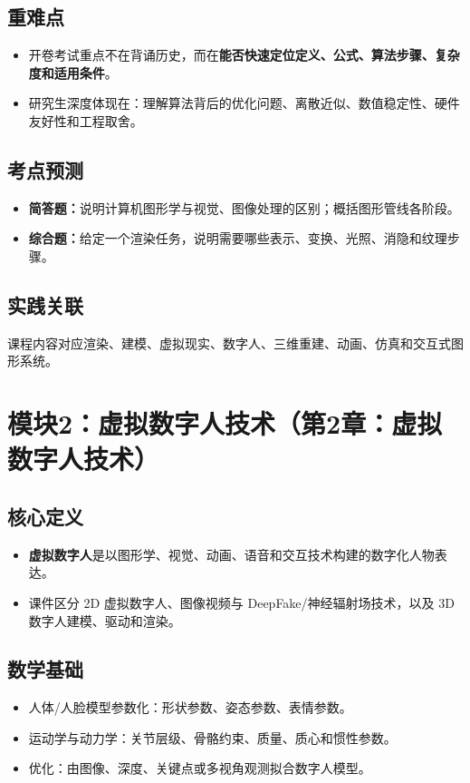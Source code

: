 \documentclass[UTF8,fontset=fandol,11pt]{ctexart}
\newcommand{\key}[1]{\textbf{#1}}
\newcommand{\exam}[1]{\textcolor{blue!55!black}{\textbf{#1}}}
\begin{document}
\subsection{重难点}
\begin{itemize}
  \item 开卷考试重点不在背诵历史，而在\key{能否快速定位定义、公式、算法步骤、复杂度和适用条件}。
  \item 研究生深度体现在：理解算法背后的优化问题、离散近似、数值稳定性、硬件友好性和工程取舍。
\end{itemize}
\subsection{考点预测}
\begin{itemize}
  \item \exam{简答题：}说明计算机图形学与视觉、图像处理的区别；概括图形管线各阶段。
  \item \exam{综合题：}给定一个渲染任务，说明需要哪些表示、变换、光照、消隐和纹理步骤。
\end{itemize}
\subsection{实践关联}
课程内容对应渲染、建模、虚拟现实、数字人、三维重建、动画、仿真和交互式图形系统。

\section{模块2：虚拟数字人技术（第2章：虚拟数字人技术）}
\subsection{核心定义}
\begin{itemize}
  \item \key{虚拟数字人}是以图形学、视觉、动画、语音和交互技术构建的数字化人物表达。
  \item 课件区分 2D 虚拟数字人、图像视频与 DeepFake/神经辐射场技术，以及 3D 数字人建模、驱动和渲染。
\end{itemize}
\subsection{数学基础}
\begin{itemize}
  \item 人体/人脸模型参数化：形状参数、姿态参数、表情参数。
  \item 运动学与动力学：关节层级、骨骼约束、质量、质心和惯性参数。
  \item 优化：由图像、深度、关键点或多视角观测拟合数字人模型。
\end{itemize}
\end{document}
